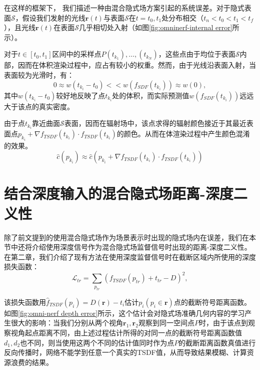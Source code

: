 在这样的框架下， 我们描述一种由混合隐式场方案引起的系统误差。对于隐式表面$\mathcal{S}$，假设我们发射的光线$\mathbf{r}(t)$与表面$\mathcal{S}$在$t=t_0,t_1$处分布相交（$t_n<t_0<t_1<t_f$），且光线$\mathbf{r}(t)$在表面$\mathcal{S}$几乎相切处入射（如图\ref{fig:omninerf-internal error}所示）。

对于$t\in[t_0, t_1]$区间中的采样点$P(t_{k_1}), \dots, (t_{k_N})$，这些点由于均位于表面$\mathcal{S}$内部，因而在体积渲染过程中，应占有较小的权重。然而，由于光线沿表面入射，当表面较为光滑时，有：
\begin{equation}
    0\approx w(t_{k_i} - t_0) << w(f_{SDF}(t_{k_i})) \approx w(0),
\end{equation}
其中$w(t_{k_i} - t_0)$较好地反映了点$t_{k_i}$处的体积，而实际预测值$w(f_{SDF}(t_{k_i}))$远远大于该点的真实密度。

由于点$t_{k_i}$靠近曲面$\mathcal{S}$表面，因而在辐射场中，该点求得的辐射颜色接近于其最近表面点$p_{k_i} + \nabla f_{TSDF}(t_{k_i})\cdot f_{TSDF}(t_{k_i})$的颜色。从而在体渲染过程中产生颜色混淆的效果。
\begin{equation}
    \hat{c}(p_{k_i})\approx\hat{c}\left(p_{k_i} + \nabla f_{TSDF}(t_{k_i})\cdot f_{TSDF}(t_{k_i})\right)
\end{equation}


\section{结合深度输入的混合隐式场距离-深度二义性}
除了前文提到的使用混合隐式场作为场景表示时出现的隐式场内在误差，我们在本节中还将介绍使用深度信号作为混合隐式场监督信号时出现的距离-深度二义性。在第二章，我们介绍了现有方法\cite{azinovic_neural_2022}在使用深度监督信号时在截断区域内所使用的深度损失函数：
\begin{equation}
    \mathcal{L}_{tr} = \sum_{p_{tr}}(f_{TSDF}(p_{tr})+t_{tr}-D)^2,
\end{equation}

该损失函数用$\hat{f}_{TSDF}(p_i) = D(\mathbf{r})-t_i$估计$p_i (p_i \in \mathbf{r})$点的截断符号距离函数。如图\ref{fig:omni-nerf depth error}所示，这个估计会对隐式场准确几何内容的学习产生很大的影响：当我们分别从两个视角$\mathbf{r}_1, \mathbf{r}_2$观察到同一空间点$P$时，由于该点到观察视角起点距离不同，由上述过程估计所得的对同一点的截断符号距离函数值$d_1, d_2$也不同，则当使用这两个不同的估计值同时作为点$P$的截断距离函数真值进行反向传播时，网络不能学到任意一个真实的TSDF值，从而导致结果模糊、计算资源浪费的结果。

